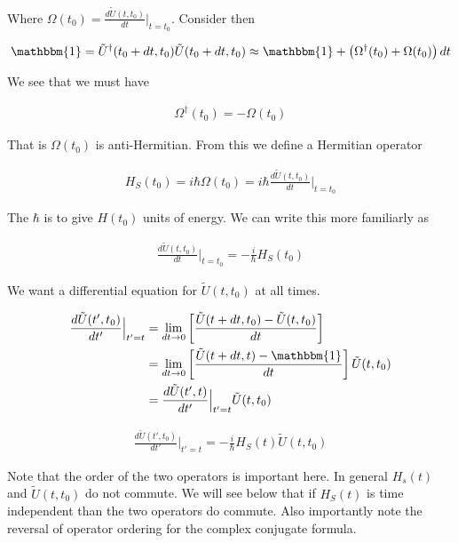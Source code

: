 \documentclass[12pt]{article}
\begin{document}
Where $\Omega(t_0) = \frac{d \tilde{U}(t,t_0)}{dt} \Bigr \rvert_{t=t_0}$.
Consider then

\begin{align}
\mathbbm{1} = \tilde{U}^{\dag}(t_0+dt,t_0)\tilde{U}(t_0+dt,t_0) \approx \mathbbm{1} + \left(\Omega^{\dag}(t_0) + \Omega(t_0)\right) dt
\end{align}

We see that we must have

\begin{align}
\Omega^{\dag}(t_0) = -\Omega(t_0)
\end{align}

That is $\Omega(t_0)$ is anti-Hermitian. From this we define a Hermitian operator

\begin{align}
H_S(t_0) = i \hbar \Omega(t_0) = i \hbar \frac{d \tilde{U}(t,t_0)}{dt} \Bigr\rvert_{t=t_0}
\end{align}

The $\hbar$ is to give $H(t_0)$ units of energy. We can write this more familiarly as

\begin{align}
\frac{d \tilde{U}(t,t_0)}{dt} \Bigr \rvert_{t=t_0} = -\frac{i}{\hbar} H_S(t_0)
\end{align}

We want a differential equation for $\tilde{U}(t,t_0)$ at all times.

\begin{align}
\frac{d \tilde{U}(t',t_0)}{d t'}\Bigr \rvert_{t'=t} &= \lim_{dt \rightarrow 0} \left[\frac{\tilde{U}(t+dt,t_0) - \tilde{U}(t,t_0)}{dt} \right]\\
&= \lim_{dt \rightarrow 0} \left[\frac{\tilde{U}(t+dt,t) - \mathbbm{1}}{dt} \right] \tilde{U}(t,t_0)\\
&= \frac{d \tilde{U}(t',t)}{dt'} \Bigr \lvert_{t'=t} \tilde{U}(t,t_0)\\
\end{align}

\begin{align}
\boxed{\frac{d \tilde{U}(t',t_0)}{d t'}\Bigr \rvert_{t'=t} = -\frac{i}{\hbar} H_S(t) \tilde{U}(t,t_0)}
\end{align}


Note that the order of the two operators is important here. In general $H_s(t)$ and $\tilde{U}(t,t_0)$ do not commute. We will see below that if $H_S(t)$ is time independent than the two operators do commute. Also importantly note the reversal of operator ordering for the complex conjugate formula.
\end{document}
